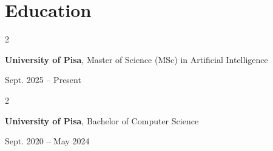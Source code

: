 \documentclass[10pt, letterpaper]{article}
\newenvironment{twocolentry}[2][]{
    \onecolentry
    \def\secondColumn{#2}
    \setcolumnwidth{\fill, 4.5cm}
    \begin{paracol}{2}
}{
    \switchcolumn
    \raggedleft
    \secondColumn
    \end{paracol}
    \endonecolentry
}
\begin{document}
\section{Education}

\begin{twocolentry}{
        Sept. 2025 -- Present
    }
    \textbf{University of Pisa}, Master of Science (MSc) in Artificial Intelligence
\end{twocolentry}

\begin{twocolentry}{
        Sept. 2020 -- May 2024
    }
    \textbf{University of Pisa}, Bachelor of Computer Science
\end{twocolentry}
\end{document}
